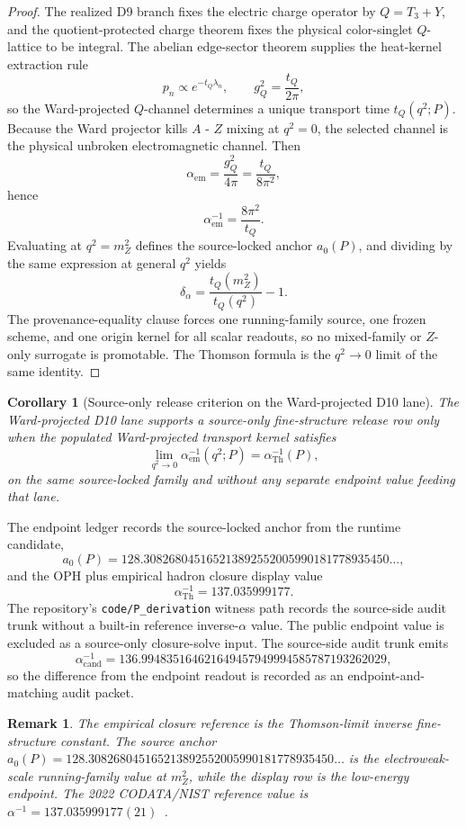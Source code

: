 \documentclass[11pt]{article}
\newtheorem{corollary}[theorem]{Corollary}
\newtheorem{remark}[theorem]{Remark}
\begin{document}
\begin{proof}
The realized D9 branch fixes the electric charge operator by \(Q=T_3+Y\), and the
quotient-protected charge theorem fixes the physical color-singlet \(Q\)-lattice to be integral.
The abelian edge-sector theorem supplies the heat-kernel extraction rule
\[
p_n\propto e^{-t_Q\lambda_n},
\qquad
g_Q^2=\frac{t_Q}{2\pi},
\]
so the Ward-projected \(Q\)-channel determines a unique transport time \(t_Q(q^2;P)\). Because
the Ward projector kills \(A\) - \(Z\) mixing at \(q^2=0\), the selected channel is the physical
unbroken electromagnetic channel. Then
\[
\alpha_{\mathrm{em}}=\frac{g_Q^2}{4\pi}=\frac{t_Q}{8\pi^2},
\]
hence
\[
\alpha_{\mathrm{em}}^{-1}=\frac{8\pi^2}{t_Q}.
\]
Evaluating at \(q^2=m_Z^2\) defines the source-locked anchor \(a_0(P)\), and dividing by the same
expression at general \(q^2\) yields
\[
\delta_\alpha=\frac{t_Q(m_Z^2)}{t_Q(q^2)}-1.
\]
The provenance-equality clause forces one running-family source, one frozen scheme, and one origin
kernel for all scalar readouts, so no mixed-family or \(Z\)-only surrogate is promotable. The
Thomson formula is the \(q^2\to0\) limit of the same identity.
\end{proof}

\begin{corollary}[Source-only release criterion on the Ward-projected D10 lane]
The Ward-projected D10 lane supports a source-only fine-structure release row only when the populated
Ward-projected transport kernel satisfies
\[
\lim_{q^2\to0}\alpha_{\mathrm{em}}^{-1}(q^2;P)=\alpha_{\mathrm{Th}}^{-1}(P),
\]
on the same source-locked family and without any separate endpoint value feeding that lane.
\end{corollary}

The endpoint ledger records the source-locked anchor from the runtime candidate,
\[
a_0(P)=128.308268045165213892552005990181778935450\ldots,
\]
and the OPH plus empirical hadron closure display value
\[
\alpha_{\mathrm{Th}}^{-1}=137.035999177.
\]
The repository's \texttt{code/P\_derivation} witness path records the source-side audit trunk without
a built-in reference inverse-\(\alpha\) value. The public endpoint value is excluded as a
source-only closure-solve input.
The source-side audit trunk emits
\[
\alpha_{\mathrm{cand}}^{-1}=136.994835164621649457949994585787193262029,
\]
so the difference from the endpoint readout is recorded as an endpoint-and-matching audit packet.

\begin{remark}
The empirical closure reference is the Thomson-limit inverse fine-structure constant. The
source anchor \(a_0(P)=128.308268045165213892552005990181778935450\ldots\) is the electroweak-scale running-family value at
\(m_Z^2\), while the display row is the low-energy endpoint. The 2022 CODATA/NIST reference value is
\(\alpha^{-1}=137.035999177(21)\)~\cite{codata2022}.
\end{remark}
\end{document}
